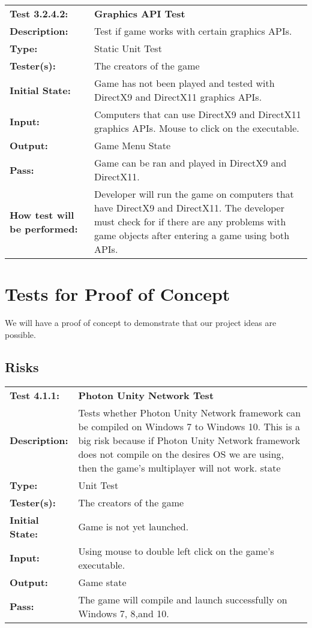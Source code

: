 \documentclass[12pt, titlepage]{article}
\begin{document}
\begin{mdframed}[linewidth=1pt]
\begin{tabularx}{\textwidth}{@{}p{3cm}X@{}}
{\bf Test 3.2.4.2:} & {\bf Graphics API Test}\\[\baselineskip]
{\bf Description:} & Test if game works with certain graphics APIs.\\[0.5\baselineskip]
{\bf Type:} & Static Unit Test\\[0.5\baselineskip]
{\bf Tester(s):} & The creators of the game\\[0.5\baselineskip]
{\bf Initial State:} & Game has not been played and tested with DirectX9 and DirectX11 graphics APIs.\\[0.5\baselineskip]
{\bf Input:} & Computers that can use DirectX9 and DirectX11 graphics APIs. Mouse to click on the executable.\\[0.5\baselineskip]
{\bf Output:} & Game Menu State\\[0.5\baselineskip]
{\bf Pass:} & Game can be ran and played in DirectX9 and DirectX11.\\[0.5\baselineskip]
{\bf How test will be performed:} & Developer will run the game on computers that have DirectX9 and DirectX11. The developer must check for if there are any problems with game objects after entering a game using both APIs.
\end{tabularx}
\end{mdframed}


\section{Tests for Proof of Concept}
We will have a proof of concept to demonstrate that our project ideas are possible.
\subsection{Risks}

\begin{mdframed}[linewidth=1pt]
\begin{tabularx}{\textwidth}{@{}p{3cm}X@{}}
{\bf Test 4.1.1:} & {\bf Photon Unity Network Test}\\[\baselineskip]
{\bf Description:} & Tests whether Photon Unity Network framework can be compiled on Windows 7 to Windows 10. This is a big risk because if Photon Unity Network framework does not compile on the desires OS we are using, then the game's multiplayer will not work. state\\[0.5\baselineskip]
{\bf Type:} & Unit Test\\[0.5\baselineskip]
{\bf Tester(s):} & The creators of the game\\[0.5\baselineskip]
{\bf Initial State:} & Game is not yet launched.\\[0.5\baselineskip]
{\bf Input:} & Using mouse to double left click on the game's executable.\\[0.5\baselineskip]
{\bf Output:} & Game state\\[0.5\baselineskip]
{\bf Pass:} & The game will compile and launch successfully on Windows 7, 8,and 10.
\end{tabularx}
\end{mdframed}
\end{document}
